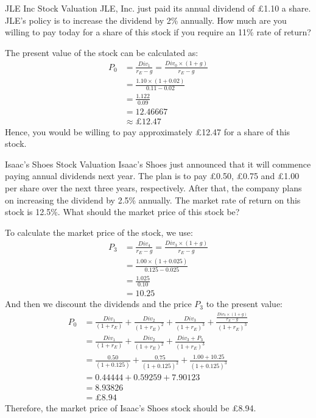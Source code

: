 \begin{examplebox}{JLE Inc Stock Valuation}
    JLE, Inc. just paid its annual dividend of £1.10 a share. JLE’s policy is to increase the dividend by 2\% annually. How much are you willing to pay today for a share of this stock if you require an 11\% rate of return?
    
    The present value of the stock can be calculated as:
    \begin{align*}
        P_0 &= \frac{Div_1}{r_E - g} = \frac{Div_0 \times (1 + g)}{r_E - g} \\
        &= \frac{1.10 \times (1 + 0.02)}{0.11 - 0.02} \\
        &= \frac{1.122}{0.09} \\
        &= 12.46667 \\
        &\approx £12.47
    \end{align*}
    Hence, you would be willing to pay approximately £12.47 for a share of this stock.
\end{examplebox}

\begin{examplebox}{Isaac's Shoes Stock Valuation}
    Isaac’s Shoes just announced that it will commence paying annual dividends next year. The plan is to pay £0.50, £0.75 and £1.00 per share over the next three years, respectively. After that, the company plans on increasing the dividend by 2.5\% annually. The market rate of return on this stock is 12.5\%. What should the market price of this stock be?
    
    To calculate the market price of the stock, we use:
    \begin{align*}
        P_3 &= \frac{Div_4}{r_E - g} = \frac{Div_3 \times (1 + g)}{r_E - g} \\
        &= \frac{1.00 \times (1 + 0.025)}{0.125 - 0.025} \\
        &= \frac{1.025}{0.10} \\
        &= 10.25
    \end{align*}
    And then we discount the dividends and the price $P_3$ to the present value:
    \begin{align*}
        P_0 &= \frac{Div_1}{(1 + r_E)} + \frac{Div_2}{(1 + r_E)^2} + \frac{Div_3}{(1 + r_E)^3}+\frac{\frac{Div_3 \times (1 + g)}{r_E - g}}{(1 + r_E)^3}  \\
         &= \frac{Div_1}{(1 + r_E)} + \frac{Div_2}{(1 + r_E)^2} + \frac{Div_3 + P_3}{(1 + r_E)^3} \\
        &= \frac{0.50}{(1 + 0.125)} + \frac{0.75}{(1 + 0.125)^2} + \frac{1.00 + 10.25}{(1 + 0.125)^3} \\
        &= 0.44444 + 0.59259 + 7.90123 \\
        &= 8.93826 \\
        &= £8.94
    \end{align*}
    Therefore, the market price of Isaac’s Shoes stock should be £8.94.
    \end{examplebox}
    
